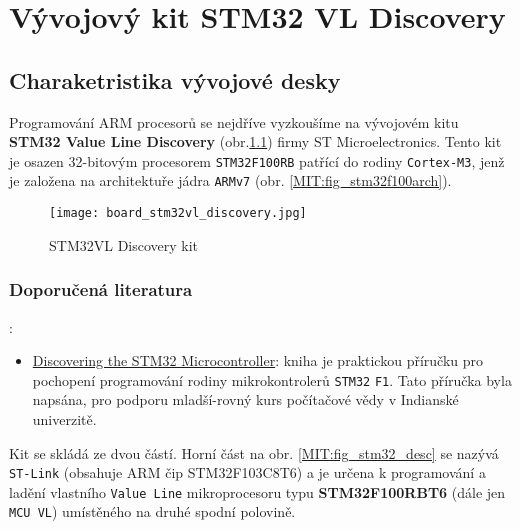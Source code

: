 {
\chapter{Vývojový kit STM32 VL Discovery}
\minitoc
  \section{Charaketristika vývojové desky}
    Programování ARM procesorů se nejdříve vyzkoušíme na vývojovém kitu \textbf{STM32 Value Line 
    Discovery} (obr.\ref{MIT:fig_stm32vlkit}) firmy ST Microelectronics. Tento kit je osazen 
    32-bitovým procesorem \texttt{STM32F100RB} patřící do rodiny \texttt{Cortex-M3}, jenž je 
    založena na architektuře jádra \texttt{ARMv7} (obr. \ref{MIT:fig_stm32f100arch}). 
  
    \begin{figure}[ht!] %
      \centering
      \texttt{[image: board\_stm32vl\_discovery.jpg]}
      \caption{STM32VL Discovery kit}
      \label{MIT:fig_stm32vlkit}
    \end{figure}
    
    \subsection{Doporučená literatura}:
    \begin{itemize}
      \item \href{http://librarian/stable.php?id=143}{Discovering the STM32 Microcontroller}: 
            kniha je praktickou příručku pro pochopení programování rodiny mikrokontrolerů 
            \texttt{STM32} \texttt{F1}. Tato příručka byla napsána, pro podporu mladší-rovný kurs 
            počítačové vědy v 
      Indianské univerzitě. 
    \end{itemize}
  
    Kit se skládá ze dvou částí. Horní část na obr. \ref{MIT:fig_stm32_desc} se nazývá 
    \texttt{ST-Link} (obsahuje ARM čip STM32F103C8T6) a je určena k programování a ladění vlastního 
    \texttt{Value Line} mikroprocesoru typu \textbf{STM32F100RBT6} (dále jen \texttt{MCU VL}) 
    umístěného na druhé spodní polovině.
  
}
